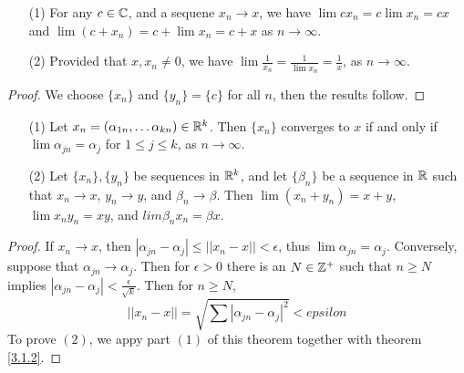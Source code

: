 \begin{corollary}
    \begin{enumerate}
        \item[(1)] For any $c \in \mathbb{C}$, and a sequene  $x_n \rightarrow x$, we have  $\lim{cx_n}=
            c\lim{x_n}=cx$ and  $\lim{(c+x_n)}=c+\lim{x_n}=c+x$ as $n \rightarrow \infty$.

        \item[(2)] Provided that  $x,x_n \neq 0$, we have  $\lim{\frac{1}{x_n}}=\frac{1}{\lim{x_n}}=\frac{1}{x}$,
            as $n \rightarrow \infty$.
    \end{enumerate}
\end{corollary}
\begin{proof}
    We choose $\{x_n\}$ and  $\{y_n\}=\{c\}$ for all  $n$, then the results follow.
\end{proof}

\begin{theorem}\label{3.1.3}
    \begin{enumerate}
        \item[(1)] Let $x_n=(\alpha_{1n}, \dots \alpha_{kn}) \in \mathbb{R}^k$. Then $\{x_n\}$ converges to  $x$
            if and only if $\lim{\alpha_{jn}}=\alpha_j$ for  $1 \leq j \leq k$, as  $n \rightarrow \infty$.

        \item[(2)] Let $\{x_n\},\{y_n\}$ be sequences in  $\mathbb{R}^k$, and let  $\{\beta_n\}$ be a
            sequence in  $\mathbb{R}$  such that $x_n \rightarrow x$,  $y_n \rightarrow y$, and  $\beta_n \rightarrow \beta$. Then
        $\lim{(x_n+y_n)}=x+y$, $\lim{x_ny_n}=xy$, and  $lim{\beta_nx_n}=\beta x$.
    \end{enumerate}
\end{theorem}
\begin{proof}
    If $x_n \rightarrow x$, then  $|\alpha_{jn}-\alpha_j| \leq ||x_n-x||<\epsilon$, thus $\lim{\alpha_{jn}}=\alpha_j$. Conversely,
    suppose that $\alpha_{jn} \rightarrow \alpha_j$. Then for $\epsilon>0$ there is an $N \in \mathbb{Z}^+$ such that
    $n \geq N$ implies $|\alpha_{jn}-\alpha_j|<\frac{\epsilon}{\sqrt{k}}$. Then for $n \geq N$,
        \begin{equation*}
            ||x_n-x||=\sqrt{\sum{|\alpha_{jn}-\alpha_j|^2}}<epsilon
        \end{equation*}
        To prove $(2)$, we appy part $(1)$ of this theorem together with theorem \ref{3.1.2}.
\end{proof}

